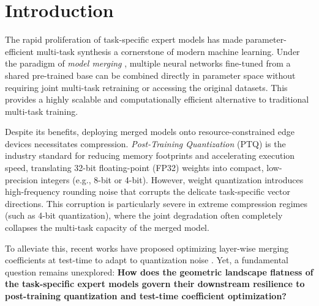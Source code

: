 \section{Introduction}
\label{sec:intro}

The rapid proliferation of task-specific expert models has made parameter-efficient multi-task synthesis a cornerstone of modern machine learning. Under the paradigm of \emph{model merging} \cite{Wortsman2022Soups, Ilharco2022TaskArithmetic}, multiple neural networks fine-tuned from a shared pre-trained base can be combined directly in parameter space without requiring joint multi-task retraining or accessing the original datasets. This provides a highly scalable and computationally efficient alternative to traditional multi-task training.

Despite its benefits, deploying merged models onto resource-constrained edge devices necessitates compression. \emph{Post-Training Quantization} (PTQ) \cite{Jacob2018Quant, Banner2019PTQ4bit} is the industry standard for reducing memory footprints and accelerating execution speed, translating 32-bit floating-point (FP32) weights into compact, low-precision integers (e.g., 8-bit or 4-bit). However, weight quantization introduces high-frequency rounding noise that corrupts the delicate task-specific vector directions. This corruption is particularly severe in extreme compression regimes (such as 4-bit quantization), where the joint degradation often completely collapses the multi-task capacity of the merged model.

To alleviate this, recent works have proposed optimizing layer-wise merging coefficients at test-time to adapt to quantization noise \cite{Yang2023AdaMerging}. Yet, a fundamental question remains unexplored: \textbf{How does the geometric landscape flatness of the task-specific expert models govern their downstream resilience to post-training quantization and test-time coefficient optimization?}

